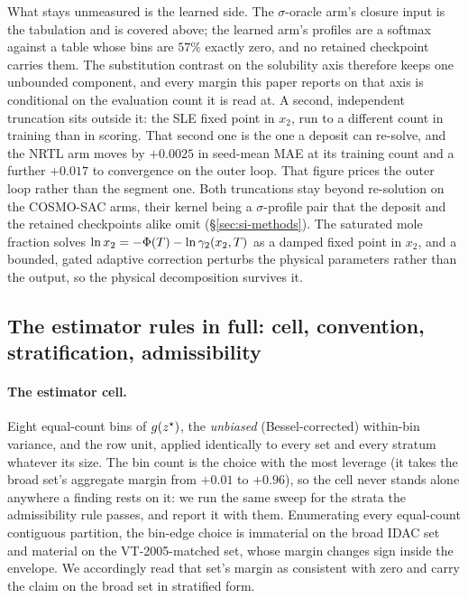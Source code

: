 What stays unmeasured is the learned side. The $\sigma$-oracle arm's closure input is the
tabulation and is covered above; the learned arm's profiles are a softmax against a table whose
bins are $57\%$ exactly zero, and no retained checkpoint carries them. The substitution contrast on
the solubility axis therefore keeps one unbounded component, and every margin this paper reports on
that axis is conditional on the evaluation count it is read at. A second, independent truncation sits outside it: the SLE fixed point in
$x_2$, run to a different count in training than in scoring. That second one is the one a
deposit can re-solve, and the NRTL arm moves by $+0.0025$ in seed-mean MAE at its training count and a further
$+0.017$ to convergence on the outer loop. That figure prices the outer loop rather than the segment one.
Both truncations stay beyond re-solution on the COSMO-SAC arms,
their kernel being a $\sigma$-profile pair that the deposit and the retained checkpoints alike omit
(\S\ref{sec:si-methods}). The saturated mole fraction solves $\ln x_2=-\Phi(T)-\ln\gamma_2(x_2,T)$ as a damped fixed point in
$x_2$, and a bounded, gated adaptive correction perturbs the physical parameters rather than the output,
so the physical decomposition survives it.

\subsection{The estimator rules in full: cell, convention, stratification, admissibility}
\label{sec:si-rules}
\paragraph{The estimator cell.} Eight equal-count bins of $g(z^\star)$, the \emph{unbiased}
(Bessel-corrected) within-bin
variance, and the row unit, applied identically to every set and every stratum whatever its size.
The bin count is the choice with the most leverage (it takes the broad set's aggregate margin from
$+0.01$ to $+0.96$), so the cell never stands alone anywhere a finding rests on it: we run the
same sweep for the strata the admissibility rule passes, and report it with them.
Enumerating every equal-count contiguous partition, the bin-edge choice is immaterial on the broad
IDAC set and material on the VT-2005-matched set, whose margin changes sign inside the envelope. We
accordingly read that set's margin as consistent with zero and carry the claim on the broad set in
stratified form.

